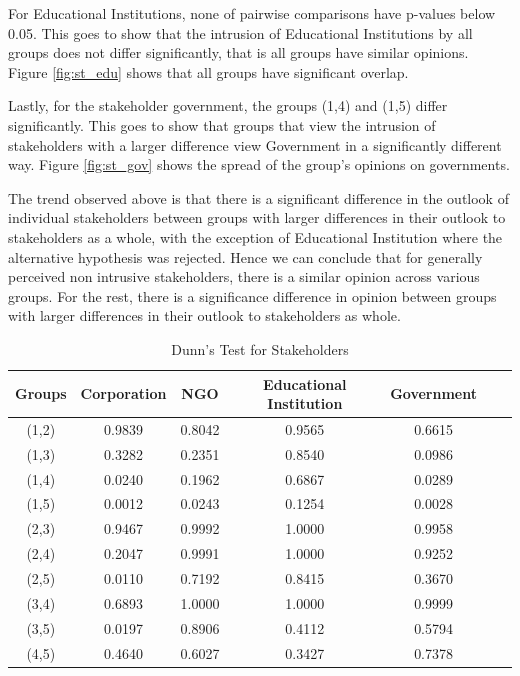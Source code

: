 For Educational Institutions, none of pairwise comparisons have p-values below 0.05. This goes to show that the intrusion of Educational Institutions by all groups does not differ significantly, that is all groups have similar opinions. Figure \ref{fig:st_edu} shows that all groups have significant overlap.

Lastly, for the stakeholder government, the groups (1,4) and (1,5) differ significantly. This goes to show that groups that view the intrusion of stakeholders with a larger difference view Government in a significantly different way. Figure \ref{fig:st_gov} shows the spread of the group's opinions on governments. 

The trend observed above is that there is a significant difference in the outlook of individual stakeholders between groups with larger differences
in their outlook to stakeholders as a whole, with the exception of Educational Institution where the alternative hypothesis was rejected. Hence we can conclude that for generally perceived non intrusive stakeholders, there is a similar opinion across various groups. For the rest, there is a significance difference in opinion between groups with larger differences in their outlook to stakeholders as whole.

\begin{table}[h!]
  \centering
  \caption{Dunn's Test for Stakeholders}
  \label{tab:dunn_stak}
  \begin{tabular}{ccccccc}
    \toprule
     Groups & Corporation & NGO & Educational Institution & Government \\
    \midrule
    (1,2) & 0.9839 & 0.8042 & 0.9565 & 0.6615 \\
    (1,3) & 0.3282 & 0.2351 & 0.8540 & 0.0986 \\
    (1,4) & 0.0240 & 0.1962 & 0.6867 & 0.0289 \\
    (1,5) & 0.0012 & 0.0243 & 0.1254 & 0.0028 \\
    (2,3) & 0.9467 & 0.9992 & 1.0000 & 0.9958 \\
    (2,4) & 0.2047 & 0.9991 & 1.0000 & 0.9252  \\
    (2,5) & 0.0110 & 0.7192 & 0.8415 & 0.3670  \\
    (3,4) & 0.6893 & 1.0000 & 1.0000 & 0.9999 \\
    (3,5) & 0.0197 & 0.8906 & 0.4112 & 0.5794  \\
    (4,5) & 0.4640 & 0.6027 & 0.3427 & 0.7378 \\
    \bottomrule
  \end{tabular}
\end{table}  

